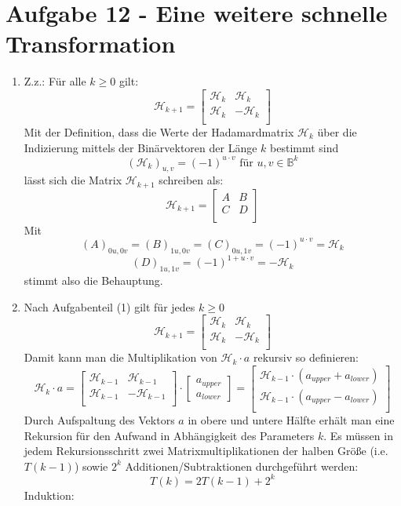 \section*{Aufgabe 12 - Eine weitere schnelle Transformation}

\renewcommand{\H}{\mathcal{H}}
\begin{enumerate}[1.]
	\item Z.z.: Für alle $k \geq 0$ gilt:
	\[ \H_{k+1} = \begin{bmatrix}
		\H_k & \H_k \\
		\H_k & -\H_k \\
	\end{bmatrix} \]
	Mit der Definition, dass die Werte der Hadamardmatrix $\H_k$ über die Indizierung 
	mittels der Binärvektoren der Länge $k$ bestimmt sind
	\[ \left( \H_k \right)_{u,v} = (-1)^{u \cdot v} \text{ für } u,v \in \mathds{B}^k \]
	lässt sich die Matrix $\H_{k+1}$ schreiben als:
	\[ \H_{k+1} = \begin{bmatrix}
		A & B \\
		C & D \\
	\end{bmatrix} \]
	Mit
	\[ \left( A \right)_{0u,0v} = \left( B\right)_{1u, 0v} = \left( C \right)_{0u, 1v} = (-1)^{u \cdot v} = \H_k \]
	\[ \left( D \right)_{1u, 1v} = (-1)^{1 + u \cdot v} = - \H_k \]
	stimmt also die Behauptung.

	\item Nach Aufgabenteil (1) gilt für jedes $k \geq 0$
	\[ \H_{k+1} = \begin{bmatrix}
		\H_k & \H_k \\
		\H_k & -\H_k \\
	\end{bmatrix} \]
	Damit kann man die Multiplikation von $\H_k \cdot a$ rekursiv so definieren:
	\[ \H_k \cdot a = 
	\begin{bmatrix}
		\H_{k-1} & \H_{k-1} \\
		\H_{k-1} & -\H_{k-1} \\
	\end{bmatrix} \cdot
	\begin{bmatrix}
		a_{upper} \\
		a_{lower}
	\end{bmatrix} = 
	\begin{bmatrix}
		\H_{k-1} \cdot (a_{upper} + a_{lower}) \\
		\H_{k-1} \cdot (a_{upper} - a_{lower}) \\
	\end{bmatrix} \]
	Durch Aufspaltung des Vektors $a$ in obere und untere Hälfte erhält man
	eine Rekursion für den Aufwand in Abhängigkeit des Parameters $k$. Es
	müssen in jedem Rekursionsschritt zwei Matrixmultiplikationen der
	halben Größe (i.e. $T(k-1)$) sowie $2^k$ Additionen/Subtraktionen
	durchgeführt werden:
	\[ T(k) = 2 T(k-1) + 2^k \]
	Induktion:


\end{enumerate}
